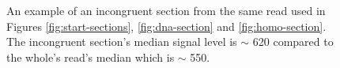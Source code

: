 \begin{figure}
\centering

	\caption[An example of an incongruent section.]{\label{fig:mess-section}An example of an incongruent section from the same read used in Figures \ref{fig:start-sections}, \ref{fig:dna-section} and \ref{fig:homo-section}. The incongruent section's median signal level is $\sim$ 620 compared to the whole's read's median which is $\sim$ 550.}
\end{figure}
